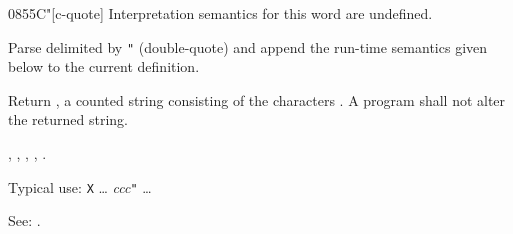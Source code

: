 \begin{worddef}[Cq]{0855}{C"}[c-quote]
\interpret
	Interpretation semantics for this word are undefined.

\compile

	Parse  delimited by \texttt{"} (double-quote) and
	append the run-time semantics given below to the current
	definition.

\runtime

	Return , a counted string consisting of the
	characters . A program shall not alter the returned
	string.

\see {},
	,
	,
	,
	.

	\begin{rationale} %
		Typical use:
			\word{:} \texttt{X} {\ldots}
				 \emph{ccc}\texttt{"}
			{\ldots} \word{;}

		See: .
	\end{rationale}

	\begin{testing}
		 \\
		 \\
		 \\
	\end{testing}
\end{worddef}

